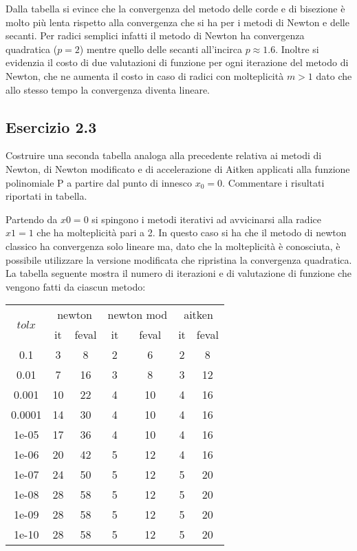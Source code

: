 Dalla tabella si evince che la convergenza del metodo delle corde e di bisezione è molto più lenta rispetto alla convergenza che si ha per i metodi di Newton e delle secanti.
Per radici semplici infatti il metodo di Newton ha convergenza quadratica ($p=2$) mentre quello delle secanti all'incirca $p\approx1.6$. 
Inoltre si evidenzia il costo di due valutazioni di funzione per ogni iterazione del metodo di Newton, che ne aumenta il costo in caso di radici con molteplicità $m > 1$ dato che allo stesso tempo la convergenza diventa lineare.

	\subsection{Esercizio 2.3}

Costruire una seconda tabella analoga alla precedente relativa ai metodi di Newton, di Newton modificato e di accelerazione di Aitken applicati alla funzione polinomiale P a partire dal punto di innesco $x_0 = 0$. Commentare i risultati riportati in tabella.

\par
Partendo da $x0=0$ si spingono i metodi iterativi ad avvicinarsi alla radice $x1=1$ che ha molteplicità pari a 2. In questo caso si ha che il metodo di newton classico ha convergenza solo lineare ma, dato che la molteplicità è conosciuta, è possibile utilizzare la versione modificata che ripristina la convergenza quadratica.
La tabella seguente mostra il numero di iterazioni e di valutazione di funzione che vengono fatti da ciascun metodo:

\begin{tabular}{ c | c | c | c | c | c | c }

\multirow{2}{*}{$tolx$} & \multicolumn{2}{c}{newton} & \multicolumn{2}{c}{newton mod} & \multicolumn{2}{c}{aitken} \\
\cline{2-7}
				 & it & feval & it & feval & it & feval \\
\hline
       0.1     &  3 &  8     & 2 &  6     & 2 &  8 \\
      0.01     &  7 & 16     & 3 &  8     & 3 & 12 \\
     0.001     & 10 & 22     & 4 & 10     & 4 & 16 \\
    0.0001     & 14 & 30     & 4 & 10     & 4 & 16 \\
     1e-05     & 17 & 36     & 4 & 10     & 4 & 16 \\
     1e-06     & 20 & 42     & 5 & 12     & 4 & 16 \\
     1e-07     & 24 & 50     & 5 & 12     & 5 & 20 \\
     1e-08     & 28 & 58     & 5 & 12     & 5 & 20 \\
     1e-09     & 28 & 58     & 5 & 12     & 5 & 20 \\
     1e-10     & 28 & 58     & 5 & 12     & 5 & 20 \\

\end{tabular}

